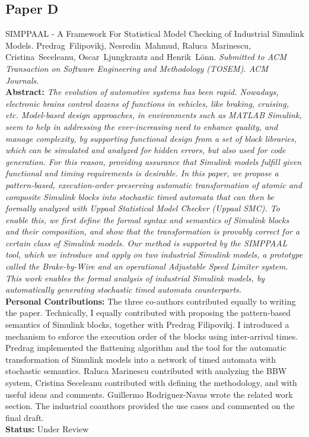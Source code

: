\subsection*{Paper D}
SIMPPAAL - A Framework For Statistical Model Checking of Industrial Simulink Models. Predrag~Filipovikj, Nesredin~Mahmud, Raluca~Marinescu, Cristina~Seceleanu, Oscar~Ljungkrantz and Henrik~L\"{o}nn. \textit{Submitted to ACM Transaction on Software Engineering and Methodology (TOSEM). ACM Journals.}\label{lbl_simulink_ilp}\\[6pt]%
	\noindent \textbf{Abstract:} \textit{The evolution of automotive systems has been rapid. Nowadays, electronic brains control dozens of functions in vehicles, like
		braking, cruising, etc. Model-based design approaches, in environments such as MATLAB Simulink, seem to help in addressing
		the ever-increasing need to enhance quality, and manage complexity, by supporting functional design from a set of block
		libraries, which can be simulated and analyzed for hidden errors, but also used for code generation. For this reason, providing
		assurance that Simulink models fulfill given functional and timing requirements is desirable. In this paper, we propose a
		pattern-based, execution-order preserving automatic transformation of atomic and composite Simulink blocks into stochastic
		timed automata that can then be formally analyzed with Uppaal Statistical Model Checker (Uppaal SMC). To enable this, we
		first define the formal syntax and semantics of Simulink blocks and their composition, and show that the transformation is
		provably correct for a certain class of Simulink models. Our method is supported by the SIMPPAAL tool, which we introduce
		and apply on two industrial Simulink models, a prototype called the Brake-by-Wire and an operational Adjustable Speed
		Limiter system. This work enables the formal analysis of industrial Simulink models, by automatically generating stochastic
		timed automata counterparts.}\\[6pt]%
	\textbf{Personal Contributions: } The three co-authors contributed equally to writing the paper. Technically, I equally contributed with proposing the pattern-based semantics of Simulink blocks, together with Predrag Filipovikj. I introduced a mechanism to enforce the execution order of the blocks using inter-arrival times. Predrag implemented the flattening algorithm and the tool for the automatic transformation of Simulink models into a network of timed automata with stochastic semantics. Raluca Marinescu contributed with analyzing the BBW system, Cristina Seceleanu contributed with defining the methodology, and with useful ideas and comments. Guillermo Rodriguez-Navas wrote the related work section. The industrial coauthors provided the use cases and commented on the final draft.\\
	\noindent\textbf{Status:} Under Review

